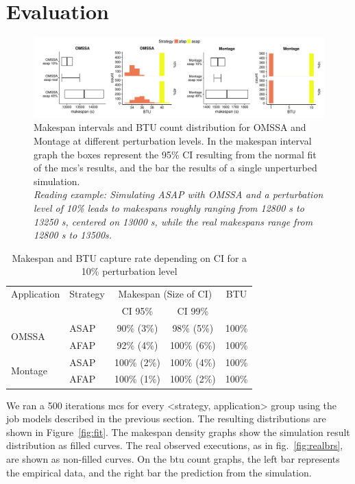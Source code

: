 \documentclass[10pt,conference,compsocconf]{IEEEtran}
\begin{document}
\section{Evaluation}
\label{sec:eval}
\begin{figure}
	\includegraphics[width=\textwidth]{gfx/int_plot.pdf}
	\caption[caption]{Makespan intervals and BTU count distribution for OMSSA and 
	Montage at different perturbation levels. In the makespan interval graph 
	the boxes represent the 95\% CI resulting from the normal fit of the
	\acs{mcs}'s results, and the bar the results of a single unperturbed 
	simulation.\\
	\textit{Reading example: Simulating ASAP with OMSSA and a perturbation 
	level of 10\% leads to makespans roughly ranging from 12800 s to 13250 s,
	centered on 13000 s, while the real makespans range from 12800 s to 13500s.}
	}
	\label{fig:int}
\end{figure}
%
\begin{table}
	\centering
	\caption{Makespan and BTU capture rate depending on CI
          for a 10\% perturbation level}\label{tab:fit} 
	\begin{tabular}{llccc}
		\toprule
		Application&Strategy&\multicolumn{2}{c}{Makespan (Size of CI)}&BTU\\
                           &         & CI 95\% & CI 99\% &\\
		\midrule
		\multirow{2}{*}{OMSSA}&ASAP&  90\% (3\%)&  98\% (5\%)& 100\%\\
				      &AFAP&  92\% (4\%)& 100\% (6\%)& 100\%\\
		\midrule
		\multirow{2}{*}{Montage}&ASAP& 100\% (2\%)& 100\% (4\%)& 100\%\\
					&AFAP& 100\% (1\%)& 100\% (2\%)& 100\%\\
		\bottomrule
	\end{tabular}
\end{table}

We ran a 500 iterations \ac{mcs} for every <strategy, application> group using
the job  models described in  the previous section. The  resulting distributions
are  shown  in  Figure~\ref{fig:fit}.   The makespan  density  graphs  show  the
simulation  result  distribution   as  filled  curves. The  real  observed
executions, as in  fig.~\ref{fig:realbrs}, are shown as  non-filled curves. On 
the \ac{btu} count graphs, the  left bar represents
the empirical data, and the right  bar the prediction from the simulation. 
\end{document}

